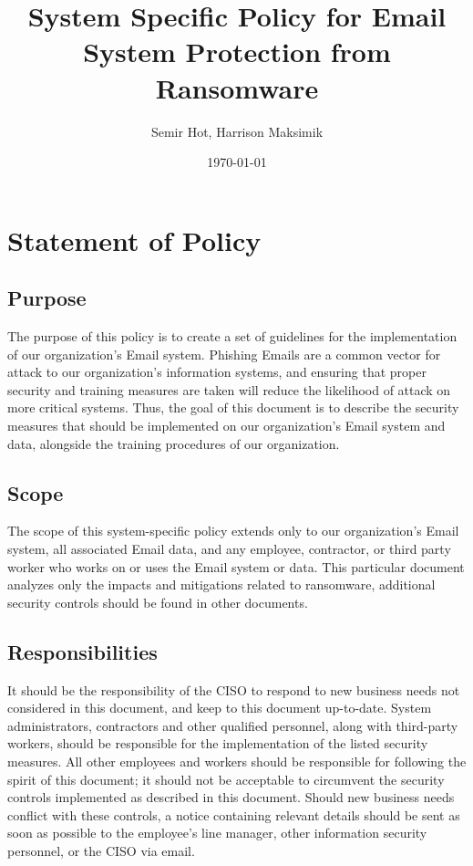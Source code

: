 \documentclass[11pt]{article}
\author{Semir Hot, Harrison Maksimik}
\date{\today}
\title{System Specific Policy for Email System Protection from Ransomware}
\begin{document}
\maketitle
\tableofcontents

\section{Statement of Policy}
\label{sec:org4b8784e}
\subsection{Purpose}
\label{sec:orga0df7a5}
The purpose of this policy is to create a set of guidelines for the implementation of our organization's Email system. Phishing Emails are a common vector for attack to our organization's information systems, and ensuring that proper security and training measures are taken will reduce the likelihood of attack on more critical systems. Thus, the goal of this document is to describe the security measures that should be implemented on our organization's Email system and data, alongside the training procedures of our organization.

\subsection{Scope}
\label{sec:org2c393c8}
The scope of this system-specific policy extends only to our organization's Email system, all associated Email data, and any employee, contractor, or third party worker who works on or uses the Email system or data. This particular document analyzes only the impacts and mitigations related to ransomware, additional security controls should be found in other documents.

\subsection{Responsibilities}
\label{sec:org90a0a02}
It should be the responsibility of the CISO to respond to new business needs not considered in this document, and keep to this document up-to-date. System administrators, contractors and other qualified personnel, along with third-party workers, should be responsible for the implementation of the listed security measures. All other employees and workers should be responsible for following the spirit of this document; it should not be acceptable to circumvent the security controls implemented as described in this document. Should new business needs conflict with these controls, a notice containing relevant details should be sent as soon as possible to the employee's line manager, other information security personnel, or the CISO via email.
\end{document}
